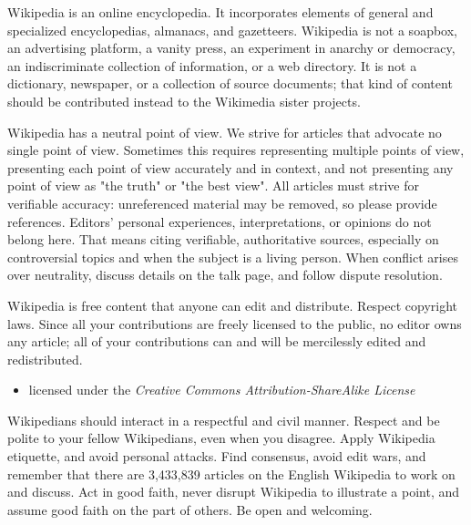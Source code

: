 \documentclass[a4paper,landscape,headrule,footrule,xetex]{foils}
\begin{document}

\begin{large}
  Wikipedia is an online encyclopedia. It incorporates elements of
  general and specialized encyclopedias, almanacs, and
  gazetteers. Wikipedia is not a soapbox, an advertising platform, a
  vanity press, an experiment in anarchy or democracy, an
  indiscriminate collection of information, or a web directory. It is
  not a dictionary, newspaper, or a collection of source documents;
  that kind of content should be contributed instead to the Wikimedia
  sister projects.
\end{large}

\begin{large}
  Wikipedia has a neutral point of view. We strive for articles that
  advocate no single point of view. Sometimes this requires
  representing multiple points of view, presenting each point of view
  accurately and in context, and not presenting any point of view as
  "the truth" or "the best view". All articles must strive for
  verifiable accuracy: unreferenced material may be removed, so please
  provide references. Editors' personal experiences, interpretations,
  or opinions do not belong here. That means citing verifiable,
  authoritative sources, especially on controversial topics and when
  the subject is a living person. When conflict arises over
  neutrality, discuss details on the talk page, and follow dispute
  resolution.
\end{large}


\begin{large}
  Wikipedia is free content that anyone can edit and
  distribute. Respect copyright laws. Since all your contributions are
  freely licensed to the public, no editor owns any article; all of
  your contributions can and will be mercilessly edited and
  redistributed.
\end{large}

\begin{itemize}
\item licensed under the \textit{Creative Commons Attribution-ShareAlike License}
\end{itemize}



\begin{large}
  Wikipedians should interact in a respectful and civil
  manner. Respect and be polite to your fellow Wikipedians, even when
  you disagree. Apply Wikipedia etiquette, and avoid personal
  attacks. Find consensus, avoid edit wars, and remember that there
  are 3,433,839 articles on the English Wikipedia to work on and
  discuss. Act in good faith, never disrupt Wikipedia to illustrate a
  point, and assume good faith on the part of others. Be open and
  welcoming.
\end{large}
\end{document}
